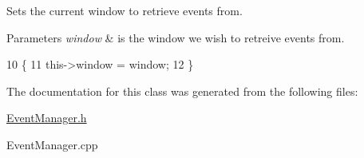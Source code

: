 Sets the current window to retrieve events from. 


\begin{DoxyParams}{Parameters}
{\em window} & is the window we wish to retreive events from. \\
\hline
\end{DoxyParams}

\begin{DoxyCode}
10                                                    \{
11     this->window = window;
12 \}
\end{DoxyCode}


The documentation for this class was generated from the following files\-:\begin{DoxyCompactItemize}
\item 
\hyperlink{_event_manager_8h}{Event\-Manager.\-h}\item 
Event\-Manager.\-cpp\end{DoxyCompactItemize}

